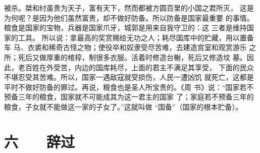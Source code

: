 \documentclass[12pt,UTF8]{ctexbook}
\begin{document}
被杀。桀和纣虽贵为天子，富有天下，然而都被方圆百里的小国之君所灭， 
这是为何呢？是因为他们虽然富贵，却不做好防备。所以防备是国家最重要 
的事情。粮食是国家的宝物，兵器是国家爪牙，城郭是用来自我守卫的：这 
三者是维持国家的工具。 
所以说：拿最高的奖赏赐给无功之人；耗尽国库中的贮藏，用以置备车 
马、衣裘和稀奇古怪之物；使役卒和奴隶受尽苦难，去建造宫室和观赏游乐 
之所；死后又做厚重的棺椁，制很多衣服。活着时修造台榭，死后又修造坟 
墓。因此，老百姓在外受苦，内边的国库耗尽，上面的君主不满足其享受， 
下面的民众不堪忍受其苦难。所以，国家一遇敌寇就受损伤，人民一遭凶饥 
就死亡，这都是平时不做好防备的罪过。再说，粮食也是圣人所宝贵的。《周 
书》说：“国家若不预备三年的粮食，国家就不可能成其为这一君主的国家 
了；家庭若不预备三年的粮食，子女就不能做这一家的子女了。”这就叫做 
“国备”（国家的根本贮备）。 

\chapter{六　　辞过}
\end{document}
